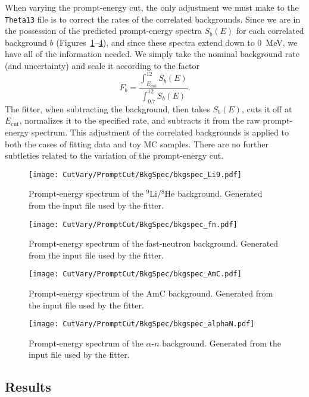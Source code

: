 \documentclass[../thesis.tex]{subfiles}
\begin{document}
When varying the prompt-energy cut, the only adjustment we must make to the \texttt{Theta13} file is to correct the rates of the correlated backgrounds. Since we are in the possession of the predicted prompt-energy spectra $S_b(E)$ for each correlated background $b$ (Figures~\ref{fig:bkgspec_Li9}--\ref{fig:bkgspec_alphaN}), and since these spectra extend down to 0~MeV, we have all of the information needed. We simply take the nominal background rate (and uncertainty) and scale it according to the factor
\begin{equation}
  F_b = \frac{\int_{E_{\mathrm{cut}}}^{12} S_b(E)}{\int_{0.7}^{12} S_b(E)}.
\end{equation}
The fitter, when subtracting the background, then takes $S_b(E)$, cuts it off at $E_{\mathrm{cut}}$, normalizes it to the specified rate, and subtracts it from the raw prompt-energy spectrum. This adjustment of the correlated backgrounds is applied to both the cases of fitting data and toy MC samples. There are no further subtleties related to the variation of the prompt-energy cut.

\begin{figure}[h]
  \texttt{[image: CutVary/PromptCut/BkgSpec/bkgspec\_Li9.pdf]}
  \caption{Prompt-energy spectrum of the $^9$Li/$^8$He background. Generated from the input file used by the fitter.}
  \label{fig:bkgspec_Li9}
\end{figure}

\begin{figure}[h]
  \texttt{[image: CutVary/PromptCut/BkgSpec/bkgspec\_fn.pdf]}
  \caption{Prompt-energy spectrum of the fast-neutron background. Generated from the input file used by the fitter.}
  \label{fig:bkgspec_fn}
\end{figure}

\begin{figure}[h]
  \texttt{[image: CutVary/PromptCut/BkgSpec/bkgspec\_AmC.pdf]}
  \caption{Prompt-energy spectrum of the AmC background. Generated from the input file used by the fitter.}
  \label{fig:bkgspec_AmC}
\end{figure}

\begin{figure}[h]
  \texttt{[image: CutVary/PromptCut/BkgSpec/bkgspec\_alphaN.pdf]}
  \caption{Prompt-energy spectrum of the $\alpha$-$n$ background. Generated from the input file used by the fitter.}
  \label{fig:bkgspec_alphaN}
\end{figure}

\subsection{Results}
\label{sec:cutVaryPromptCutResults}
\end{document}
